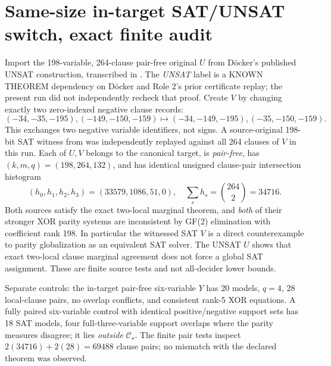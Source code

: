 \documentclass[11pt]{article}
\begin{document}
\section{Same-size in-target SAT/UNSAT switch, exact finite audit}
Import the 198-variable, 264-clause pair-free original $U$ from D\"ocker's published UNSAT construction, transcribed in
.
The \emph{UNSAT} label is a KNOWN THEOREM dependency on D\"ocker and Role 2's prior certificate replay; the present run did not independently recheck that proof. Create $V$ by changing exactly two zero-indexed negative clause records:
\[
(-34,-35,-195),(-149,-150,-159)
\longmapsto
(-34,-149,-195),(-35,-150,-159).
\]
This exchanges two negative variable identifiers, not signs. A source-original 198-bit SAT witness from
was independently replayed against all 264 clauses of $V$ in this run. Each of $U,V$ belongs to the canonical target, is \emph{pair-free}, has $(k,m,q)=(198,264,132)$, and has identical unsigned clause-pair intersection histogram
\[
(h_0,h_1,h_2,h_3)=(33579,1086,51,0),\quad\sum_sh_s={264\choose2}=34716.
\]
Both sources satisfy the exact two-local marginal theorem, and \emph{both} of their stronger XOR parity systems are inconsistent by GF(2) elimination with coefficient rank 198. In particular the witnessed SAT $V$ is a direct counterexample to parity globalization as an equivalent SAT solver. The UNSAT $U$ shows that exact two-local clause marginal agreement does not force a global SAT assignment. These are finite source tests and not all-decider lower bounds.
\par\noindent Separate controls: the in-target pair-free six-variable $Y$ has 20 models, $q=4$, 28 local-clause pairs, no overlap conflicts, and consistent rank-5 XOR equations. A fully paired six-variable control with identical positive/negative support sets has 18 SAT models, four full-three-variable support overlaps where the parity measures disagree; it lies \emph{outside} $\mathcal C_\star$. The finite pair tests inspect $2(34716)+2(28)=69488$ clause pairs; no mismatch with the declared theorem was observed.
\end{document}

